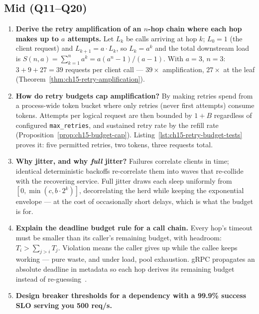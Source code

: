 \subsection*{Mid (Q11--Q20)}
\begin{enumerate}[label=\textbf{Q\arabic*.}, leftmargin=1.6cm, start=11]
  \item \textbf{Derive the retry amplification of an $n$-hop chain where
        each hop makes up to $a$ attempts.}
        Let $L_k$ be calls arriving at hop $k$; $L_0 = 1$ (the client
        request) and $L_{k+1} = a \cdot L_k$, so $L_k = a^k$ and the total
        downstream load is $S(n,a) = \sum_{k=1}^{n} a^k =
        a(a^n-1)/(a-1)$. With $a = 3$, $n = 3$: $3 + 9 + 27 = 39$ requests
        per client call --- $39\times$ amplification, $27\times$ at the
        leaf (Theorem~\ref{thm:ch15-retry-amplification}).
  \item \textbf{How do retry budgets cap amplification?}
        By making retries spend from a process-wide token bucket where only
        retries (never first attempts) consume tokens. Attempts per logical
        request are then bounded by $1 + B$ regardless of configured
        \texttt{max\_retries}, and sustained retry rate by the refill rate
        (Proposition~\ref{prop:ch15-budget-cap}).
        Listing~\ref{lst:ch15-retry-budget-tests} proves it: five permitted
        retries, two tokens, three requests total.
  \item \textbf{Why jitter, and why \emph{full} jitter?}
        Failures correlate clients in time; identical deterministic
        backoffs re-correlate them into waves that re-collide with the
        recovering service. Full jitter draws each sleep uniformly from
        $[0, \min(c, b \cdot 2^{k})]$, decorrelating the herd while keeping
        the exponential envelope --- at the cost of occasionally short
        delays, which is what the budget is for.
  \item \textbf{Explain the deadline budget rule for a call chain.}
        Every hop's timeout must be smaller than its caller's remaining
        budget, with headroom: $T_i > \sum_{j > i} T_j$. Violation means
        the caller gives up while the callee keeps working --- pure waste,
        and under load, pool exhaustion. gRPC propagates an absolute
        deadline in metadata so each hop derives its remaining budget
        instead of re-guessing~\cite{grpcdocs}.
  \item \textbf{Design breaker thresholds for a dependency with a 99.9\%
        success SLO serving you 500 req/s.}

\end{enumerate}
